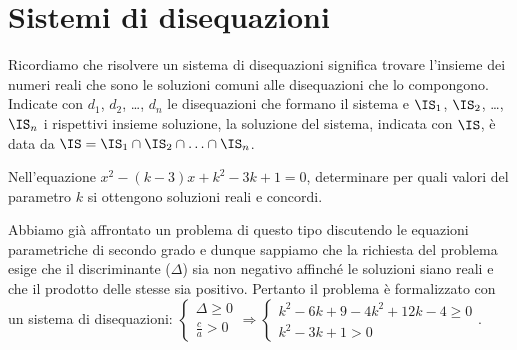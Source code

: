 \section{Sistemi di disequazioni}

Ricordiamo che risolvere un sistema di disequazioni significa trovare l'insieme dei numeri reali che sono le soluzioni comuni alle disequazioni che lo compongono. Indicate con $d_{1}$, $d_{2}$, \ldots, $d_n$ le disequazioni che formano il sistema e $\IS_{1}$, $\IS_{2}$, \ldots, $\IS_n$ i rispettivi insieme soluzione, la soluzione del sistema, indicata con $\IS$, è data da $\IS=\IS_1\cap \IS_{2}\cap \ldots \cap \IS_n$.

\begin{problema}
Nell'equazione $x^2-(k-3)x+k^2-3k+1=0$, determinare per quali valori del parametro $k$ si ottengono soluzioni reali e concordi.
\end{problema}
Abbiamo già affrontato un problema di questo tipo discutendo le equazioni parametriche di secondo grado e dunque sappiamo che la richiesta del problema esige che il discriminante ($\Delta$) sia non negativo affinché le soluzioni siano reali e che il prodotto delle stesse sia positivo. Pertanto il problema è formalizzato con un sistema di disequazioni: $\left\{\begin{array}{l}{\Delta \ge 0}\\{\frac c a>0}\end{array}\right. \Rightarrow \left\{\begin{array}{l}{k^2-6k+9-4k^2+12k-4\ge 0}\\{k^2-3k+1>0}\end{array}\right.$.

